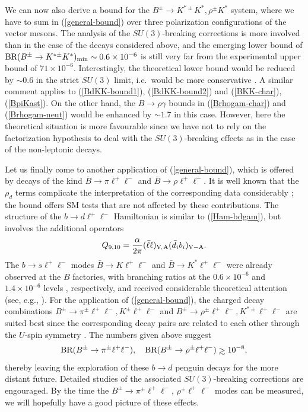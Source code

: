 \documentclass[11pt]{cernrep}
\begin{document}
We can now also derive a bound for the  
$B^\pm\to K^{\ast\pm}K^{\ast}, \rho^\pm K^\ast$ system, where 
we have to sum in (\ref{general-bound}) over three polarization configurations
of the vector mesons. The analysis of the $SU(3)$-breaking corrections is
more involved than in the case of the decays considered above, and the 
emerging lower bound of 
$\mbox{BR}(B^\pm\to K^{\ast\pm} K^\ast)_{\rm min}\sim0.6\times 10^{-6}$
is still very far from the experimental upper bound of $71\times 10^{-6}$.
Interestingly, the theoretical lower bound would be reduced by $\sim 0.6$ in 
the strict $SU(3)$ limit, i.e.\ would be more conservative \cite{FR2}. A similar 
comment applies to (\ref{BdKK-bound1}), (\ref{BdKK-bound2}) and  
(\ref{BKK-char}), (\ref{BpiKast}). On the other hand, the 
$B\to\rho\gamma$ bounds in (\ref{Brhogam-char}) and 
(\ref{Brhogam-neut}) would be enhanced by $\sim 1.7$ in this case.
However, here the theoretical situation is more favourable since we 
have not to rely on the factorization hypothesis to deal with the 
$SU(3)$-breaking effects as in the case of the non-leptonic decays. 

Let us finally come to another application of (\ref{general-bound}), which 
is offered by decays of the kind $\bar B\to \pi \ell^+\ell^-$ and 
$\bar B\to \rho \ell^+\ell^-$. It is
well known that the $\rho_d$ terms complicate the interpretation of
the corresponding data considerably \cite{LHC-Book}; the bound offers
SM tests that are not affected by these contributions. The 
structure of the $b\to d \ell^+\ell^-$ Hamiltonian is similar to 
(\ref{Ham-bdgam}), but involves the additional operators
\begin{equation}
Q_{9,10}=\frac{\alpha}{2\pi}(\bar\ell\ell)_{\rm V\!,\,A}
(\bar d_i b_i)_{\rm V-A}.
\end{equation}
The $b \to s \ell^+\ell^-$ modes $\bar B\to K \ell^+\ell^-$ 
and $\bar B\to K^\ast \ell^+\ell^-$ were already observed at the $B$ 
factories, with branching ratios at the $0.6\times 10^{-6}$ and 
$1.4\times 10^{-6}$ levels \cite{HFAG}, respectively, and received considerable
theoretical attention (see, e.g., \cite{BKll}). For the application
of (\ref{general-bound}), the charged decay combinations
$B^\pm\to \pi^\pm \ell^+\ell^-, K^\pm \ell^+\ell^-$ and
$B^\pm\to \rho^\pm \ell^+\ell^-, K^{\ast\pm} \ell^+\ell^-$ are suited
best since the corresponding decay pairs are related to each other 
through the $U$-spin symmetry \cite{HM}. The numbers given above
suggest
\begin{equation}\label{Bpi-ellell-bounds}
\mbox{BR}(B^\pm\to \pi^\pm \ell^+\ell^-), \quad
\mbox{BR}(B^\pm\to \rho^\pm \ell^+\ell^-)
\mathrel{\hbox{\rlap{\hbox{\lower4pt\hbox{$\sim$}}}\hbox{$>$}}}
10^{-8},
\end{equation}
thereby leaving the exploration of these $b\to d$ penguin decays for the more 
distant future. Detailed studies of the associated $SU(3)$-breaking corrections 
are engouraged. By the time the $B^\pm\to \pi^\pm \ell^+\ell^-$, 
$\rho^\pm \ell^+\ell^-$ modes can be measured, we will
hopefully have a good picture of these effects. 
\end{document}
